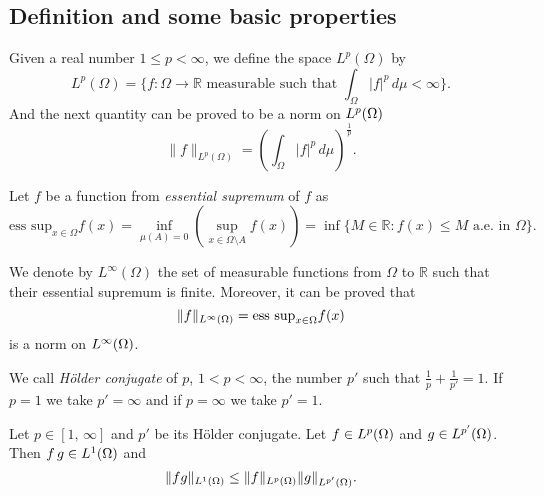 \subsection*{Definition and some basic properties}
\begin{definition}
Given a real number $1\leq p < \infty$, we define the space $L^p(\Omega)$ by
$$L^p(\Omega)=\{f:\Omega \rightarrow \mathbb{R}\text{ measurable such that } \int_\Omega |f|^p\,d\mu <\infty\}.$$
And the next quantity can be proved to be a norm on ${L^{p}(\Omega)}$
$$\|f\|_{L^p(\Omega)} =\left(\int_\Omega |f|^p\,d\mu\right)^{\frac{1}{p}}.$$
\end{definition}
\begin{definition} Let $f$ be a function from \emph{essential supremum} of $f$ as
$$\text{ess sup}_{x\in \Omega}f(x)=\inf_{\mu(A)=0}\left(\sup_{x\in \Omega\setminus A} f(x)\right)=\inf\{M\in\mathbb{R}:f(x)\leq M \text{ a.e. in }\Omega\}.$$
\end{definition}
\begin{definition}
We denote by $L^\infty(\Omega)$ the set of measurable functions from $\Omega$ to $\mathbb{R}$ such that their essential supremum is finite. Moreover, it can be proved that
$$\|f\|_{L^{\infty}(\Omega)}=\text{ess sup}_{x\in \Omega}f(x)$$
is a norm on ${L^{\infty}(\Omega)}$.
\end{definition}

We call \emph{H\"older conjugate} of $p$, $1< p<\infty$, the number $p'$ such that $\frac{1}{p}+\frac{1}{p'}=1$. If $p=1$ we take $p'=\infty$ and if $p=\infty$ we take $p'=1$.

\begin{lemma} Let $p\in[1,\,\infty]$ and $p'$ be its H\"older conjugate. Let $f\in {L^{p}(\Omega)}$ and $g\in {L^{p'}(\Omega)}$. Then $f\,g\in {L^{1}(\Omega)}$ and
$$\|fg\|_{L^{1}(\Omega)}\leq \|f\|_{L^{p}(\Omega)}\|g\|_{L^{p'}(\Omega)}.$$
\end{lemma}

